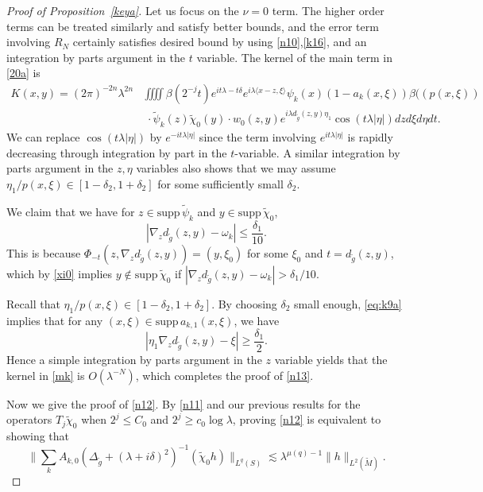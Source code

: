 \documentclass[10pt]{amsart}
\newcommand{\la}{\lambda}
\newcommand{\supp}{\mathrm{supp }}
\newcommand{\1}{{\bf 1}}
\begin{document}
\begin{proof}[Proof of Proposition~\ref{keya}]
Let us focus on the $\nu=0$ term. The higher order terms can be treated similarly and satisfy better bounds, and the error term involving $R_N$ certainly satisfies desired bound by using  \eqref{n10},\eqref{k16}, and an integration by parts argument in the $t$ variable. The kernel of the main term in \eqref{20a} is 
\begin{equation}\label{mk}
    \begin{aligned}
        K( x, y)=(2\pi)^{-2n}\la^{2n}&\iiiint \beta(2^{-j}t)e^{it\la-t\delta} e^{i\la\langle  x- z,\xi \rangle} \psi_k(x)(1-a_k(x,\xi))\beta((p(x,\xi))\\ 
        &\,\,\cdot\tilde\psi_k(z)\tilde\chi_0( y)
        \cdot w_0( z, y) e^{i\la d_{\tilde g}( z,
 y)\eta_1} \cos (t\la|\eta|) dzd\xi d\eta dt.
    \end{aligned}
\end{equation}
We can replace $\cos (t\la|\eta|)$ by $e^{-it\la|\eta|}$ since the term involving 
$e^{it\la|\eta|}$ is rapidly decreasing through integration by part in the $t$-variable. A similar integration by parts argument in the $z, \eta$ variables also shows that we may assume ${\eta_1}/{p(x,\xi)}\in [1-\delta_2, 1+\delta_2]$ for some sufficiently small $\delta_2$.


{We claim that} we have for $z\in \supp\,\tilde \psi_k$
and $y\in \supp\,\tilde\chi_0$,
\begin{equation}\label{eq:k9a}
| \nabla_{ z}d_{\tilde g}( z,
 y)-\omega_k|\le {\frac{\delta_1}{10}}.
\end{equation}
 This is because
$
\Phi_{-t}(z,\nabla_{ z}d_{\tilde g}( z,
 y))=( y,\xi_0)
$
for some $\xi_0$ and $t=d_{\tilde g}( z,
 y)$, which by \eqref{xi0} implies $y\notin \supp\,\tilde \chi_0 $ if $\left|{\nabla_{ z}d_{\tilde g}( z,
 y)} -\omega_k\right|> \delta_1/10$. 

 Recall that ${\eta_1}/{p(x,\xi)}\in [1-\delta_2, 1+\delta_2]$. By choosing $\delta_2$ small enough, \eqref{eq:k9a} implies that 
for any $(x, \xi)\in \supp \,a_{k,1}(x,\xi)$, we have 
$$
| \eta_1\nabla_{ z}d_{\tilde g}( z,
 y)-\xi|\ge {\frac{\delta_1}{2}}.$$ Hence a simple 
 integration by parts argument in the $z$
variable yields that 
  the kernel in \eqref{mk} is $O(\la^{-N})$, which completes the proof of \eqref{n13}.



 


Now we give the proof of  \eqref{n12}. By \eqref{n11} and our previous results for the operators $T_j\tilde \chi_0$ when $2^j\le C_0$ and $2^j\ge c_0\log\la$, proving \eqref{n12} is equivalent to showing that 
\begin{equation}\label{n16}
        \|\sum_{k}A_{k,0}(\Delta_{\tilde g}+(\la+i\delta)^2)^{-1} (\tilde \chi_0 h)\|_{L^q(S)}\lesssim 
    \la^{\mu(q)-1}\|h\|_{L^2(\tilde M)}.
\end{equation}



\end{proof}
\end{document}
